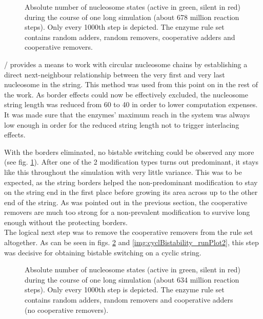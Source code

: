             \begin{figure}[htpb!]
                \centering
                \caption{Absolute number of nucleosome states (active in green, silent in red) during the course of one long simulation (about 678 million reaction steps). Only every 1000th step is depicted. The enzyme rule set contains random adders, random removers, cooperative adders and cooperative removers.}
                \label{img:cyclWCoopRem_runPlot1}
            \end{figure}

            \ed/ provides a means to work with circular nucleosome chains by establishing a direct next-neighbour relationship between the very first and very last nucleosome in the string. This method was used from this point on in the rest of the work. As border effects could now be effectively excluded, the nucleosome string length was reduced from 60 to 40 in order to lower computation expenses. It was made sure that the enzymes' maximum reach in the system was always low enough in order for the reduced string length not to trigger interlacing effects.

            With the borders eliminated, no bistable switching could be observed any more (see fig. \ref{img:cyclWCoopRem_runPlot1}). After one of the 2 modification types turns out predominant, it stays like this throughout the simulation with very little variance. This was to be expected, as the string borders helped the non-predominant modification to stay on the string end in the first place before growing its area across up to the other end of the string. As was pointed out in the previous section, the cooperative removers are much too strong for a non-prevalent modification to survive long enough without the protecting borders.\\

            The logical next step was to remove the cooperative removers from the rule set altogether. As can be seen in figs. \ref{img:cyclBistability_runPlot1} and \ref{img:cyclBistability_runPlot2}, this step was decisive for obtaining bistable switching on a cyclic string.

            \begin{figure}[htpb!]
                \centering
                \caption{Absolute number of nucleosome states (active in green, silent in red) during the course of one long simulation (about 634 million reaction steps). Only every 1000th step is depicted. The enzyme rule set contains random adders, random removers and cooperative adders (no cooperative removers).}
                \label{img:cyclBistability_runPlot1}
            \end{figure}

